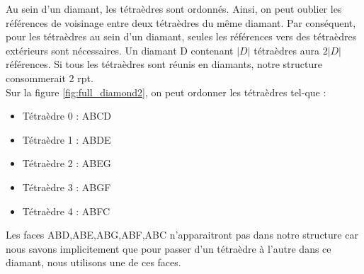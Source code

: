 \documentclass[a4paper,11pt,openany]{article}
\begin{document}
\noindent
Au sein d'un diamant, les tétraèdres sont ordonnés. Ainsi, on peut oublier les références de voisinage entre deux tétraèdres du même diamant. Par conséquent, pour les tétraèdres au sein d'un diamant, seules les références vers des tétraèdres extérieurs sont nécessaires. Un diamant D contenant $|D|$ tétraèdres aura $2|D|$ références. Si tous les tétraèdres sont réunis en diamants, notre structure consommerait 2 rpt.\\
Sur la figure \ref{fig:full_diamond2}, on peut ordonner les tétraèdres tel-que :
\begin{itemize}
\item Tétraèdre 0 : ABCD
\item Tétraèdre 1 : ABDE
\item Tétraèdre 2 : ABEG
\item Tétraèdre 3 : ABGF
\item Tétraèdre 4 : ABFC
\end{itemize}
Les faces ABD,ABE,ABG,ABF,ABC n'apparaitront pas dans notre structure car nous savons implicitement que pour passer d'un tétraèdre à l'autre dans ce diamant, nous utilisons une de ces faces.\\
\end{document}

